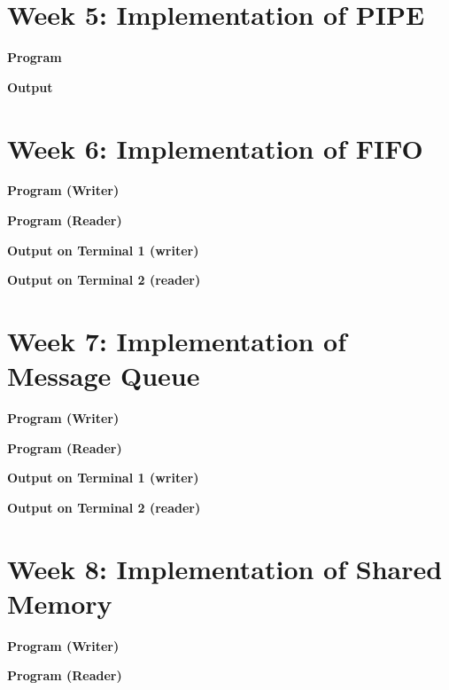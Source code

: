 \documentclass{article}
\begin{document}
\newpage
\section{Week 5: Implementation of PIPE}

\noindent \textbf{\large{Program}}


\newpage
\noindent \textbf{\large{Output}}


\newpage
\section{Week 6: Implementation of FIFO}

\noindent \textbf{\large{Program (Writer)}}


\newpage
\noindent \textbf{\large{Program (Reader)}}


\newpage
\noindent \textbf{\large{Output} on Terminal 1 (writer)}


\noindent \textbf{\large{Output} on Terminal 2 (reader)}


\newpage
\section{Week 7: Implementation of Message Queue}

\noindent \textbf{\large{Program (Writer)}}


\newpage
\noindent \textbf{\large{Program (Reader)}}


\newpage
\noindent \textbf{\large{Output} on Terminal 1 (writer)}


\noindent \textbf{\large{Output} on Terminal 2 (reader)} 


\newpage
\section{Week 8: Implementation of Shared Memory}

\noindent \textbf{\large{Program (Writer)}}


\newpage
\noindent \textbf{\large{Program (Reader)}}

\end{document}

